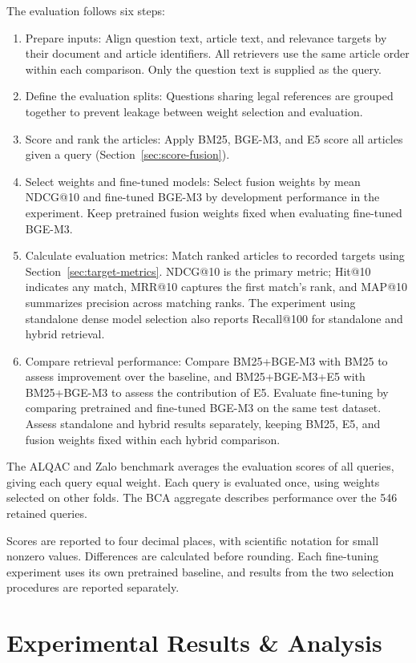 The evaluation follows six steps:
\begin{enumerate}
    \item Prepare inputs: Align question text, article text, and relevance targets by their document and article identifiers. All retrievers use the same article order within each comparison. Only the question text is supplied as the query.
    \item Define the evaluation splits: Questions sharing legal references are grouped together to prevent leakage between weight selection and evaluation.
    \item Score and rank the articles: Apply BM25, BGE-M3, and E5 score all articles given a query (Section~\ref{sec:score-fusion}).
    \item Select weights and fine-tuned models: Select fusion weights by mean NDCG@10 and fine-tuned BGE-M3 by development performance in the experiment. Keep pretrained fusion weights fixed when evaluating fine-tuned BGE-M3.
    \item Calculate evaluation metrics: Match ranked articles to recorded targets using Section~\ref{sec:target-metrics}. NDCG@10 is the primary metric; Hit@10 indicates any match, MRR@10 captures the first match’s rank, and MAP@10 summarizes precision across matching ranks. The experiment using standalone dense model selection also reports Recall@100 for standalone and hybrid retrieval.
    \item Compare retrieval performance: Compare BM25+BGE-M3 with BM25 to assess improvement over the baseline, and BM25+BGE-M3+E5 with BM25+BGE-M3 to assess the contribution of E5. Evaluate fine-tuning by comparing pretrained and fine-tuned BGE-M3 on the same test dataset. Assess standalone and hybrid results separately, keeping BM25, E5, and fusion weights fixed within each hybrid comparison.
\end{enumerate}

The ALQAC and Zalo benchmark averages the evaluation scores of all queries, giving each query equal weight. Each query is evaluated once, using weights selected on other folds. The BCA aggregate describes performance over the 546 retained queries.


Scores are reported to four decimal places, with scientific notation for small nonzero values. Differences are calculated before rounding. Each fine-tuning experiment uses its own pretrained baseline, and results from the two selection procedures are reported separately.

\section{Experimental Results \& Analysis}
\label{sec:experimental-results-analysis}

